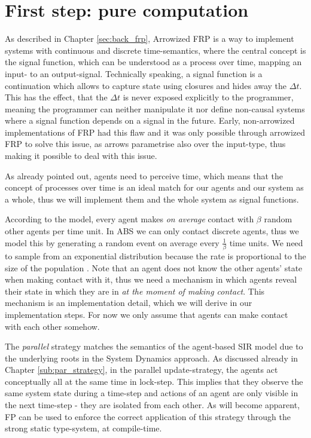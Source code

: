 \section{First step: pure computation}
\label{sec:timedriven_firststep}
As described in Chapter \ref{sec:back_frp}, Arrowized FRP \cite{hughes_generalising_2000} is a way to implement systems with continuous and discrete time-semantics, where the central concept is the signal function, which can be understood as a process over time, mapping an input- to an output-signal. Technically speaking, a signal function is a continuation which allows to capture state using closures and hides away the $\Delta t$. This has the effect, that the $\Delta t$ is never exposed explicitly to the programmer, meaning the programmer can neither manipulate it nor define non-causal systems where a signal function depends on a signal in the future. Early, non-arrowized implementations of FRP had this flaw and it was only possible through arrowized FRP to solve this issue, as arrows parametrise also over the input-type, thus making it possible to deal with this issue.

As already pointed out, agents need to perceive time, which means that the concept of processes over time is an ideal match for our agents and our system as a whole, thus we will implement them and the whole system as signal functions.

According to the model, every agent makes \textit{on average} contact with $\beta$ random other agents per time unit. In ABS we can only contact discrete agents, thus we model this by generating a random event on average every $\frac{1}{\beta}$ time units. We need to sample from an exponential distribution because the rate is proportional to the size of the population \cite{borshchev_system_2004}. Note that an agent does not know the other agents' state when making contact with it, thus we need a mechanism in which agents reveal their state in which they are in \textit{at the moment of making contact}. This mechanism is an implementation detail, which we will derive in our implementation steps. For now we only assume that agents can make contact with each other somehow.

The \textit{parallel} strategy matches the semantics of the agent-based SIR model due to the underlying roots in the System Dynamics approach. As discussed already in Chapter \ref{sub:par_strategy}, in the parallel update-strategy, the agents act conceptually all at the same time in lock-step. This implies that they observe the same system state during a time-step and actions of an agent are only visible in the next time-step - they are isolated from each other. As will become apparent, FP can be used to enforce the correct application of this strategy through the strong static type-system, at compile-time.

